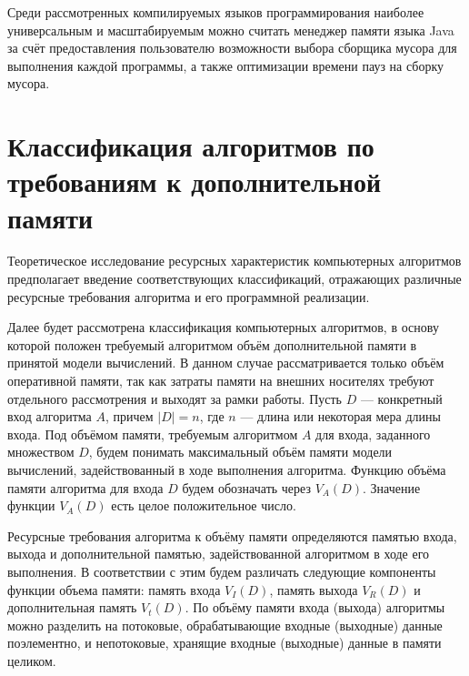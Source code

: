 Среди рассмотренных компилируемых языков программирования наиболее универсальным и масштабируемым можно считать менеджер памяти языка Java за счёт предоставления пользователю возможности выбора сборщика мусора для выполнения каждой программы, а также оптимизации времени пауз на сборку мусора.



\section{Классификация алгоритмов по требованиям к дополнительной памяти}
\label{alg_classes}

Теоретическое исследование ресурсных характеристик компьютерных алгоритмов предполагает введение соответствующих классификаций, отражающих различные ресурсные требования алгоритма и его программной реализации.~\cite{uljanov}

Далее будет рассмотрена классификация компьютерных алгоритмов, в основу которой положен требуемый алгоритмом объём дополнительной памяти в принятой модели вычислений. В данном случае рассматривается только объём оперативной
памяти, так как затраты памяти на внешних носителях требуют отдельного рассмотрения и выходят за рамки работы. Пусть $D$ --- конкретный вход алгоритма $A$, причем $|D| = n$, где $n$ --- длина или некоторая мера длины входа. Под объёмом памяти, требуемым алгоритмом $A$ для входа, заданного множеством $D$, будем понимать максимальный объём памяти модели вычислений, задействованный в ходе выполнения алгоритма. Функцию объёма памяти алгоритма для входа $D$ будем обозначать через $V_A(D)$. Значение функции $V_A(D)$ есть целое положительное число.~\cite{uljanov}

Ресурсные требования алгоритма к объёму памяти определяются памятью входа, выхода и дополнительной памятью, задействованной алгоритмом в ходе его выполнения. В соответствии с этим будем различать следующие компоненты функции объема памяти: память входа $V_I(D)$, память выхода $V_R(D)$ и дополнительная память $V_t(D)$. По объёму памяти входа (выхода) алгоритмы можно разделить на потоковые, обрабатывающие входные (выходные) данные поэлементно, и непотоковые, хранящие входные (выходные) данные в памяти целиком.~\cite{uljanov}

